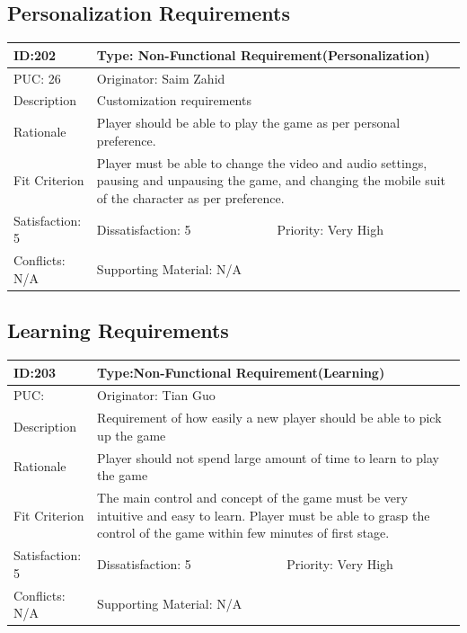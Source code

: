 \documentclass{article}
\begin{document}
\subsection{Personalization Requirements}
\begin{table}[H]
    \begin{tabular}{|l|l|l|}
    \hline
    ID:202 & \multicolumn{2}{l|}{Type: Non-Functional Requirement(Personalization)} \\ \hline
    PUC: 26 & \multicolumn{2}{l|}{Originator: Saim Zahid} \\ \hline
    Description & \multicolumn{2}{m{0.85\textwidth}|}{Customization requirements} \\ \hline
    Rationale & \multicolumn{2}{m{0.85\textwidth}|}{Player should be able to play the game as per personal preference.} \\ \hline
    Fit Criterion & \multicolumn{2}{m{0.85\textwidth}|}{Player must be able to change the video and audio settings, pausing and unpausing the game, and changing the mobile suit of the character as per preference.} \\ \hline
    Satisfaction: 5 & Dissatisfaction: 5 & Priority: Very High \\ \hline
    Conflicts: N/A & \multicolumn{2}{l|}{Supporting Material: N/A} \\ \hline
    \end{tabular}
    \end{table}
    
    
\subsection{Learning Requirements}
\begin{table}[H]
    \begin{tabular}{|l|l|l|}
    \hline
    ID:203 & \multicolumn{2}{l|}{Type:Non-Functional Requirement(Learning)} \\ \hline
    PUC: & \multicolumn{2}{l|}{Originator: Tian Guo} \\ \hline
    Description & \multicolumn{2}{m{0.85\textwidth}|}{Requirement of how easily a new player should be able to pick up the game} \\ \hline
    Rationale & \multicolumn{2}{m{0.85\textwidth}|}{Player should not spend large amount of time to learn to play the game} \\ \hline
    Fit Criterion & \multicolumn{2}{m{0.85\textwidth}|}{The main control and concept of the game must be very intuitive and easy to learn. Player must be able to grasp the control of the game within few minutes of first stage.} \\ \hline
    Satisfaction: 5 & Dissatisfaction: 5 & Priority: Very High \\ \hline
    Conflicts: N/A & \multicolumn{2}{l|}{Supporting Material: N/A} \\ \hline
    \end{tabular}
    \end{table}
\end{document}
